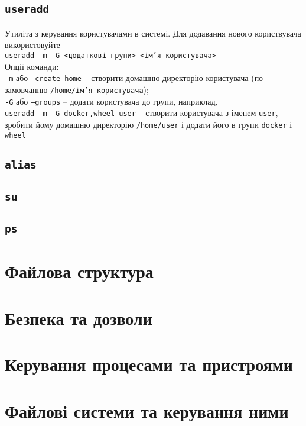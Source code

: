 \documentclass[10pt,a4paper]{fancyhandout}
\begin{document}
\subsection{\texttt{useradd}}
Утиліта з керування користувачами в системі. Для додавання нового користвувача використовуйте \\
\texttt{useradd -m -G <додаткові групи> <ім'я користувача>} \\
Опції команди: \\
\texttt{-m} або \texttt{--create-home} -- створити домашню директорію користувача (по замовчанню \texttt{/home/ім'я користувача}); \\
\texttt{-G} або \texttt{--groups} -- додати користувача до групи, наприклад, \\
\texttt{useradd -m -G docker,wheel user} -- створити користувача з іменем \texttt{user}, зробити йому домашню директорію \texttt{/home/user} і додати його в групи \texttt{docker} і \texttt{wheel} \\
\goodbreak

\subsection{\texttt{alias}}

\goodbreak

\subsection{\texttt{su}}
\goodbreak

\subsection{\texttt{ps}}
\goodbreak


\section{Файлова структура}
\section{Безпека та дозволи} \label{Безпека та дозволи}
\section{Керування процесами та пристроями}
\section{Файлові системи та керування ними}
\tableofcontents
\doclicenseThis
\end{document}
